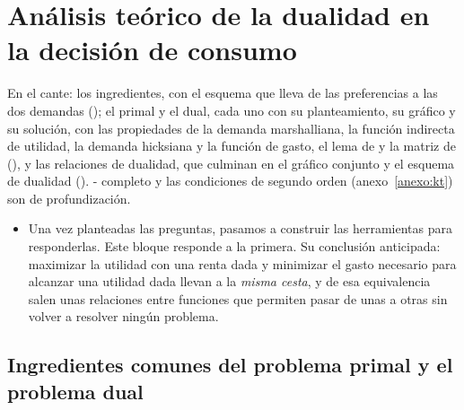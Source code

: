 \documentclass[11pt]{article}
\begin{document}
\section{Análisis teórico de la dualidad en la decisión de consumo}\label{sec:analisis-teorico-dualidad}

\begin{notaopositor}
En el cante: los ingredientes, con el esquema que lleva de las preferencias a las dos demandas (); el primal y el dual, cada uno con su planteamiento, su gráfico y su solución, con las propiedades de la demanda marshalliana, la función indirecta de utilidad, la demanda hicksiana y la función de gasto, el lema de  y la matriz de  (), y las relaciones de dualidad, que culminan en el gráfico conjunto y el esquema de dualidad (). - completo y las condiciones de segundo orden (anexo~\ref{anexo:kt}) son de profundización.
\end{notaopositor}

\begin{itemize}
\item Una vez planteadas las preguntas, pasamos a construir las herramientas para responderlas. Este bloque responde a la primera. Su conclusión anticipada: maximizar la utilidad con una renta dada y minimizar el gasto necesario para alcanzar una utilidad dada llevan a la \emph{misma cesta}, y de esa equivalencia salen unas relaciones entre funciones que permiten pasar de unas a otras sin volver a resolver ningún problema.
\end{itemize}

\subsection{Ingredientes comunes del problema primal y el problema dual}\label{sec:ingredientes-comunes-problema}
\end{document}
